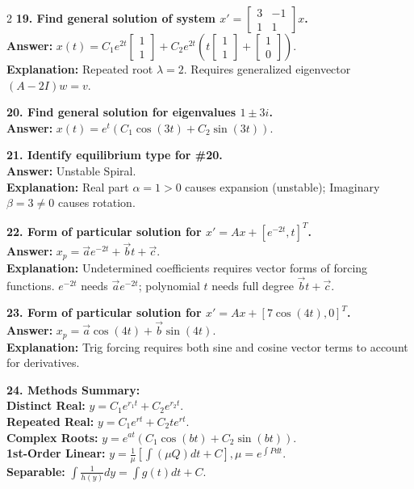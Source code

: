\documentclass[4pt]{extarticle}
\begin{document}
\begin{multicols}{2}
\textbf{19. Find general solution of system $x' = \begin{bmatrix} 3 & -1 \\ 1 & 1 \end{bmatrix}x$.} \\
\textbf{Answer:} $x(t) = C_1e^{2t}\begin{bmatrix} 1 \\ 1 \end{bmatrix} + C_2e^{2t}(t\begin{bmatrix} 1 \\ 1 \end{bmatrix} + \begin{bmatrix} 1 \\ 0 \end{bmatrix})$. \\
\textbf{Explanation:} Repeated root $\lambda=2$. Requires generalized eigenvector $(A-2I)w=v$.

\textbf{20. Find general solution for eigenvalues $1 \pm 3i$.} \\
\textbf{Answer:} $x(t) = e^{t}(C_1 \cos(3t) + C_2 \sin(3t))$.

\textbf{21. Identify equilibrium type for \#20.} \\
\textbf{Answer:} Unstable Spiral. \\
\textbf{Explanation:} Real part $\alpha=1 > 0$ causes expansion (unstable); Imaginary $\beta=3 \neq 0$ causes rotation.

\textbf{22. Form of particular solution for $x'=Ax + [e^{-2t}, t]^T$.} \\
\textbf{Answer:} $x_p = \vec{a}e^{-2t} + \vec{b}t + \vec{c}$. \\
\textbf{Explanation:} Undetermined coefficients requires vector forms of forcing functions. $e^{-2t}$ needs $\vec{a}e^{-2t}$; polynomial $t$ needs full degree $\vec{b}t + \vec{c}$.

\textbf{23. Form of particular solution for $x'=Ax + [7 \cos(4t), 0]^T$.} \\
\textbf{Answer:} $x_p = \vec{a} \cos(4t) + \vec{b} \sin(4t)$. \\
\textbf{Explanation:} Trig forcing requires both sine and cosine vector terms to account for derivatives.

\textbf{24. Methods Summary:} \\
\textbf{Distinct Real:} $y = C_1e^{r_1t} + C_2e^{r_2t}$. \\
\textbf{Repeated Real:} $y = C_1e^{rt} + C_2te^{rt}$. \\
\textbf{Complex Roots:} $y = e^{at}(C_1 \cos(bt) + C_2 \sin(bt))$. \\
\textbf{1st-Order Linear:} $y = \frac{1}{\mu} [\int (\mu Q) dt + C], \mu = e^{\int P dt}$. \\
\textbf{Separable:} $\int \frac{1}{h(y)} dy = \int g(t) dt + C$.


\end{multicols}
\end{document}
